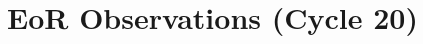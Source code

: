 \documentclass[a4paper,12pt]{article}
\begin{document}
                                                                                                                                                                                                                                                                                                                                                                                                                                                                                                                                                                                                                                                                                                                                                                                                                                                                                                                                                                                                                                                                                                                                                                                                                                                                                                                                                                                                                                                                                                                                                                                                                                                                                                                                                                                                                                                                                                                                                                                                                                                                            \section{EoR Observations (Cycle 20)}
\end{document}
